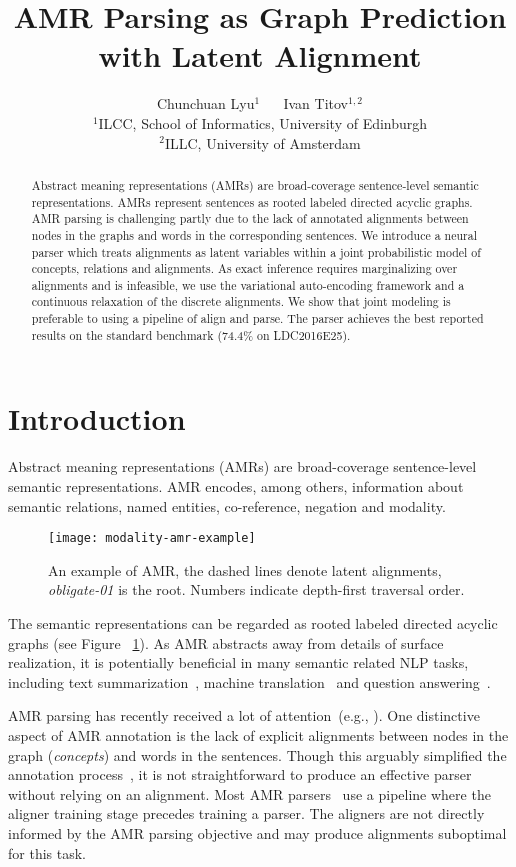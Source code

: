 \documentclass[11pt,a4paper]{article}
\title{AMR Parsing as Graph Prediction with Latent Alignment}
\author{
Chunchuan Lyu$^1$ ~~  Ivan Titov$^{1,2}$ \\
$^1$ILCC, School of Informatics, University of Edinburgh \\
$^2$ILLC, University of Amsterdam \\ 
}
\date{}
\begin{document}
\maketitle
\begin{abstract}
Abstract meaning representations (AMRs) are broad-coverage sentence-level semantic representations. AMRs represent sentences as rooted labeled directed acyclic graphs. AMR parsing is challenging partly due to the lack of annotated alignments between
nodes in the graphs and words in the corresponding sentences.
We introduce a neural parser which treats alignments as latent variables within a joint probabilistic model of concepts, relations and alignments. 
As exact inference requires marginalizing over alignments and 
is infeasible, we use the variational auto-encoding framework and a continuous relaxation of the discrete alignments.
We show that joint modeling 
is preferable to using a pipeline of align and parse. 
The parser achieves the best reported results on the standard benchmark (74.4\% on LDC2016E25). 


\end{abstract}


\section{Introduction}

Abstract meaning representations (AMRs) \cite{Banarescu13abstractmeaning} are broad-coverage sentence-level semantic representations. 
AMR encodes, among others, information about semantic relations, named entities, co-reference, negation and modality.
\begin{figure}[ht!]
\centering
\texttt{[image: modality-amr-example]}
\vspace{-2ex}
\caption{An example of AMR, the dashed lines denote latent alignments, {\it obligate-01} is the root. Numbers indicate depth-first traversal order.}
\label{fig:amr-example}
\end{figure}
The semantic representations can be regarded as rooted labeled directed acyclic graphs (see Figure ~\ref{fig:amr-example}). As AMR abstracts away from details of surface realization, it is potentially beneficial in many semantic related NLP tasks, including text summarization~\cite{Liu2015TowardAS,dohare2017text}, machine translation~\cite{Jones2012SemanticsBasedMT} and question answering~\cite{AAAI1612345}. 

AMR parsing has recently received a lot of attention~(e.g., \cite{Flanigan_adiscriminative,Artzi2015BroadcoverageCS,konstas-EtAl:2017:Long}). One distinctive aspect of AMR annotation is the lack of explicit alignments between nodes in the graph ({\it concepts}) and words in the sentences. Though this arguably simplified the annotation process~\cite{Banarescu13abstractmeaning}, it is not straightforward to produce an effective parser without relying on an alignment. 
Most AMR parsers~\cite{Marco,jamr-16,werling2015robust,wang2017getting,foland-martin:2017:Long}
use a pipeline where the aligner training stage precedes training a parser.
The aligners are not directly informed by the AMR parsing objective and may produce alignments suboptimal for this task.
\end{document}
